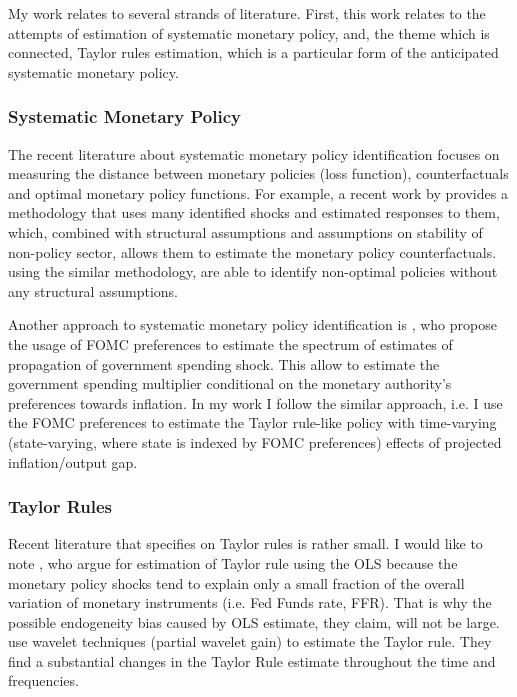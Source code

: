 \documentclass[11pt]{article}
\begin{document}
My work relates to several strands of literature. 
First, this work relates to the attempts of estimation of systematic monetary policy, and, the theme which is connected, Taylor rules estimation, which is a particular form of the anticipated systematic monetary policy. 

\subsubsection{Systematic Monetary Policy}

The recent literature about systematic monetary policy identification focuses on measuring the distance between monetary policies (loss function), counterfactuals and optimal monetary policy functions. 
For example, a recent work by \citet{McKayWolf2023} provides a methodology that uses many identified shocks and estimated responses to them, which, combined with structural assumptions and assumptions on stability of non-policy sector, allows them to estimate the monetary policy counterfactuals. 
\citet{BarnichonMesters2023} using the similar methodology, are able to identify non-optimal policies without any structural assumptions. 


Another approach to systematic monetary policy identification is \citet{HIM2023}, who propose the usage of FOMC preferences to estimate the spectrum of estimates of propagation of government spending shock. 
This allow \citeauthor{HIM2023} to estimate the government spending multiplier conditional on the monetary authority's preferences towards inflation.
In my work I follow the similar approach, i.e. I use the FOMC preferences to estimate the Taylor rule-like policy with time-varying (state-varying, where state is indexed by FOMC preferences) effects of projected inflation/output gap.



\subsubsection{Taylor Rules}


Recent literature that specifies on Taylor rules is rather small. I would like to note \citet{Carvalho2021}, who argue for estimation of Taylor rule using the OLS because the monetary policy shocks tend to explain only a small fraction of the overall variation of monetary instruments (i.e. Fed Funds rate, FFR). 
That is why the possible endogeneity bias caused by OLS estimate, they claim, will not be large.
\citet{Aguiar2018} use wavelet techniques (partial wavelet gain) to estimate the Taylor rule. They find a substantial changes in the Taylor Rule estimate throughout the time and frequencies.
\end{document}
